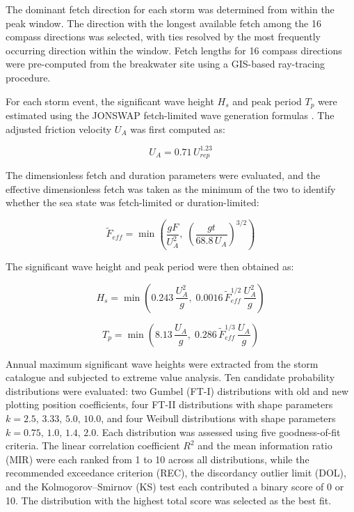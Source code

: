\documentclass[a4paper, 11pt]{article}
\begin{document}
The dominant fetch direction for each storm was determined from within 
the peak window. The direction with the longest available fetch among 
the 16 compass directions was selected, with ties resolved by the most 
frequently occurring direction within the window. Fetch lengths for 
16 compass directions were pre-computed from the breakwater site using 
a GIS-based ray-tracing procedure.

For each storm event, the significant wave height $H_{s}$ and peak 
period $T_p$ were estimated using the JONSWAP fetch-limited wave 
generation formulas \cite{Hasselmann1973}. The adjusted friction 
velocity $U_A$ was first computed as:

\begin{equation}
    U_A = 0.71 \, U_{rep}^{1.23}
\end{equation}

The dimensionless fetch and duration parameters were evaluated, and the 
effective dimensionless fetch was taken as the minimum of the two to 
identify whether the sea state was fetch-limited or duration-limited:

\begin{equation}
    \tilde{F}_{eff} = \min\!\left(\frac{gF}{U_A^2},\; 
    \left(\frac{gt}{68.8\,U_A}\right)^{3/2}\right)
\end{equation}

The significant wave height and peak period were then obtained as:

\begin{equation}
    H_s = \min\!\left(0.243\,\frac{U_A^2}{g},\;
    0.0016\,\tilde{F}_{eff}^{1/2}\,\frac{U_A^2}{g}\right)
\end{equation}

\begin{equation}
    T_p = \min\!\left(8.13\,\frac{U_A}{g},\;
    0.286\,\tilde{F}_{eff}^{1/3}\,\frac{U_A}{g}\right)
\end{equation}

Annual maximum significant wave heights were extracted from the storm 
catalogue and subjected to extreme value analysis. Ten candidate 
probability distributions were evaluated: two Gumbel (FT-I) 
distributions with old and new plotting position coefficients, four 
FT-II distributions with shape parameters $k = 2.5,\,3.33,\,5.0,\,10.0$, 
and four Weibull distributions with shape parameters 
$k = 0.75,\,1.0,\,1.4,\,2.0$. Each distribution was assessed using 
five goodness-of-fit criteria. The linear correlation coefficient $R^2$ 
and the mean information ratio (MIR) were each ranked from 1 to 10 
across all distributions, while the recommended exceedance criterion 
(REC), the discordancy outlier limit (DOL), and the 
Kolmogorov--Smirnov (KS) test each contributed a binary score of 0 
or 10. The distribution with the highest total score was selected as 
the best fit.
\end{document}
